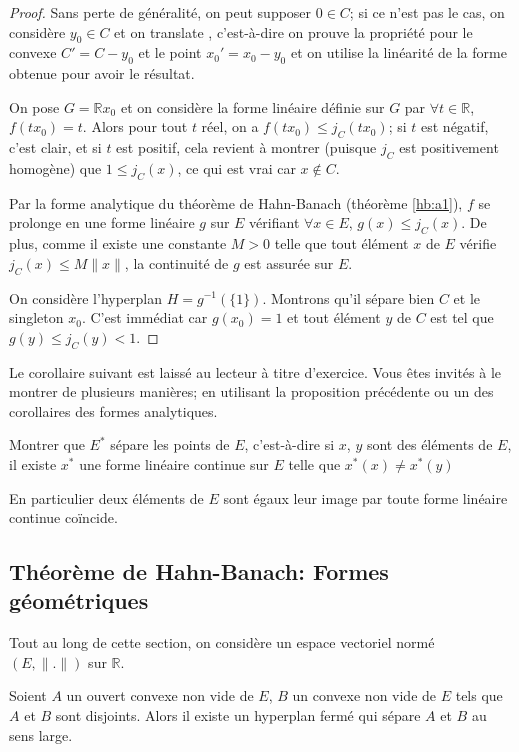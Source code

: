 \begin{proof}
Sans perte de généralité, on peut supposer $0\in C$; si ce n'est pas le cas,
on considère $y_0\in C$ et \og on translate \fg, c'est-à-dire on prouve la
propriété pour le convexe $C' = C - y_0$ et le point $x_0' = x_0 - y_0$ et on utilise
la linéarité de la forme obtenue pour avoir le résultat.

On pose $G = \mathbb{R}x_0$ et on considère la forme linéaire définie sur $G$
par $\forall t\in \mathbb{R}$, $f(tx_0) = t$. Alors pour tout $t$ réel, on a
$f(tx_0)\leq j_C(tx_0)$; si $t$ est négatif, c'est clair, et si $t$ est positif,
cela revient à montrer (puisque $j_C$ est positivement homogène)
que $1\leq j_C(x)$, ce qui est vrai car $x\notin C$.

Par la forme analytique du théorème de Hahn-Banach (théorème \ref{hb:a1}),
$f$ se prolonge en une forme linéaire $g$ sur $E$ vérifiant $\forall x \in E$,
$g(x)\leq j_C(x)$.
De plus, comme il existe une constante $M >0$ telle que tout élément
$x$ de $E$ vérifie $j_C(x) \leq M\|x\|$, la continuité de $g$ est assurée
sur $E$.

On considère l'hyperplan $H = g^{-1}(\{1\})$. Montrons qu'il sépare bien $C$ et
le singleton $x_0$. C'est immédiat car $g(x_0) = 1$ et tout élément $y$ de $C$
est tel que $g(y)\leq j_C(y) < 1$.
\end{proof}

Le corollaire suivant est laissé au lecteur à titre d'exercice. Vous êtes
invités à le montrer de plusieurs manières; en utilisant la proposition
précédente ou un des corollaires des formes analytiques.

\begin{exo}
  Montrer que $E^*$ sépare les points de $E$, c'est-à-dire si $x$, $y$
  sont des éléments de $E$, il existe $x^*$ une forme linéaire continue
  sur $E$ telle que $x^*(x)\neq x^*(y)$
\end{exo}

En particulier deux éléments de $E$ sont égaux \ssi{} leur image
par toute forme linéaire continue coïncide.

\subsection{Théorème de Hahn-Banach: Formes géométriques}
Tout au long de cette section, on considère un espace vectoriel normé
$(E, \|.\|)$ sur $\mathbb{R}$.
\begin{thm} \label{hb:g1}
  Soient $A$ un ouvert convexe non vide de $E$, $B$ un convexe non vide
  de $E$ tels que $A$ et $B$ sont disjoints. Alors il existe un hyperplan
  fermé qui sépare $A$ et $B$ au sens large.
\end{thm}

